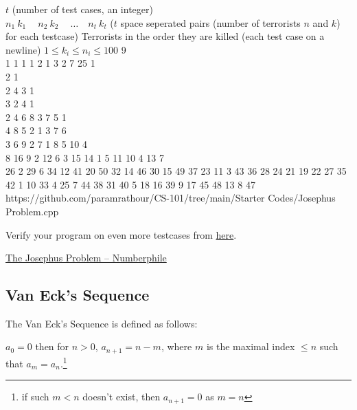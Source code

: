 \begin{testcases}
	{$t$ \hfill(number of test cases, an integer)\\
	$n_1\ k_1\ \quad n_2\ k_2\ \quad \ldots\quad n_t\ k_t$ \hfill($t$ space seperated pairs (number of terrorists $n$ and $k$) for each testcase)}
	{Terrorists in the order they are killed \hfill(each test case on a newline)}
	{$1 \leq k_i \leq n_i \leq 100$}
	{9\\1 1 1 1 2 1 3 2 7 25}
	{1\\2 1\\2 4 3 1\\3 2 4 1\\2 4 6 8 3 7 5 1\\4 8 5 2 1 3 7 6\\3 6 9 2 7 1 8 5 10 4\\8 16 9 2 12 6 3 15 14 1 5 11 10 4 13 7\\26 2 29 6 34 12 41 20 50 32 14 46 30 15 49 37 23 11 3 43 36 28 24 21 19 22 27 35 42 1 10 33 4 25 7 44 38 31 40 5 18 16 39 9 17 45 48 13 8 47}
	{https://github.com/paramrathour/CS-101/tree/main/Starter Codes/Josephus Problem.cpp}
\end{testcases}
\begin{note}
	Verify your program on even more testcases from \href{https://cses.fi/problemset/task/2163/}{here}.
\end{note}
\begin{funvideo}
	\href{https://youtu.be/uCsD3ZGzMgE}{The Josephus Problem -- Numberphile}
\end{funvideo}
\subsection{Van Eck's Sequence}
The Van Eck's Sequence is defined as follows:

$a_0 = 0$ then for $n>0$, $a_{n+1} = n-m$, where $m$ is the maximal index $\leq n$ such that $a_{m}=a_{n}$.\footnote{if such $m<n$ doesn't exist, then $a_{n+1}=0$ as $m=n$}

